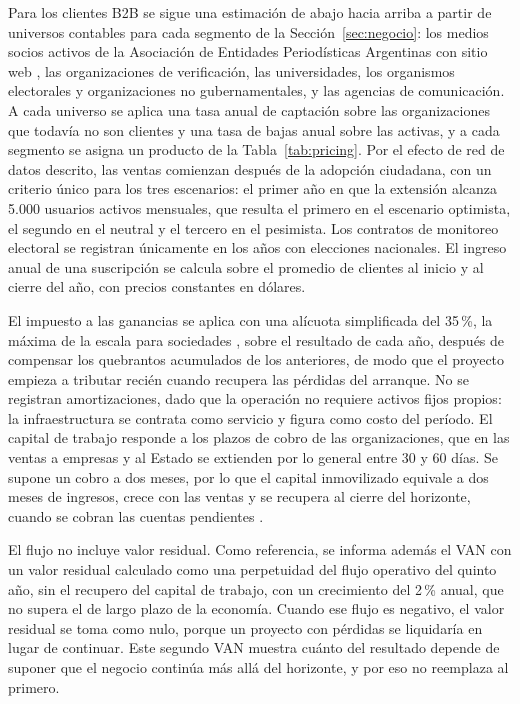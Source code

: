 Para los clientes B2B se sigue una estimación de abajo hacia arriba a partir de universos contables para cada segmento de la Sección~\ref{sec:negocio}: los medios socios activos de la Asociación de Entidades Periodísticas Argentinas con sitio web \parencite{ADEPA2026}, las organizaciones de verificación, las universidades, los organismos electorales y organizaciones no gubernamentales, y las agencias de comunicación. A cada universo se aplica una tasa anual de captación sobre las organizaciones que todavía no son clientes y una tasa de bajas anual sobre las activas, y a cada segmento se asigna un producto de la Tabla~\ref{tab:pricing}. Por el efecto de red de datos descrito, las ventas comienzan después de la adopción ciudadana, con un criterio único para los tres escenarios: el primer año en que la extensión alcanza 5.000 usuarios activos mensuales, que resulta el primero en el escenario optimista, el segundo en el neutral y el tercero en el pesimista. Los contratos de monitoreo electoral se registran únicamente en los años con elecciones nacionales. El ingreso anual de una suscripción se calcula sobre el promedio de clientes al inicio y al cierre del año, con precios constantes en dólares.

El impuesto a las ganancias se aplica con una alícuota simplificada del 35\,\%, la máxima de la escala para sociedades \parencite{CongresoNacion2021}, sobre el resultado de cada año, después de compensar los quebrantos acumulados de los anteriores, de modo que el proyecto empieza a tributar recién cuando recupera las pérdidas del arranque. No se registran amortizaciones, dado que la operación no requiere activos fijos propios: la infraestructura se contrata como servicio y figura como costo del período. El capital de trabajo responde a los plazos de cobro de las organizaciones, que en las ventas a empresas y al Estado se extienden por lo general entre 30 y 60 días. Se supone un cobro a dos meses, por lo que el capital inmovilizado equivale a dos meses de ingresos, crece con las ventas y se recupera al cierre del horizonte, cuando se cobran las cuentas pendientes \parencite{SapagEtAl2014}.

El flujo no incluye valor residual. Como referencia, se informa además el VAN con un valor residual calculado como una perpetuidad del flujo operativo del quinto año, sin el recupero del capital de trabajo, con un crecimiento del 2\,\% anual, que no supera el de largo plazo de la economía. Cuando ese flujo es negativo, el valor residual se toma como nulo, porque un proyecto con pérdidas se liquidaría en lugar de continuar. Este segundo VAN muestra cuánto del resultado depende de suponer que el negocio continúa más allá del horizonte, y por eso no reemplaza al primero.

